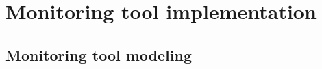 
\chapter{Monitoring tool implementation} %

\label{Chapter4} %



\section{Monitoring tool modeling}
